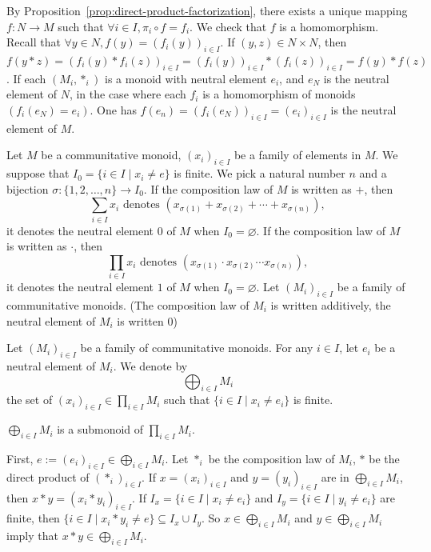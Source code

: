 \begin{proofenv}
    By Proposition~\ref{prop:direct-product-factorization},  there exists a unique mapping $f:N\rightarrow M$ such that $\forall i\in I,  \pi_i\circ f=f_i $. We check that $f$ is a homomorphism. 
    \newline
    Recall that $\forall y\in N,  f(y)=(f_i(y))_{i\in I}$. If $(y, z)\in N\times N$,  then $f(y*z)=(f_i(y)*f_i(z))_{i\in I}=(f_i(y))_{i\in I}*(f_i(z))_{i\in I}=f(y)*f(z)$. If each $(M_i, *_i)$ is a monoid with neutral element $e_i$,  and $e_N$ is the neutral element of $N$,  in the case where each $f_i$ is a homomorphism of monoids $(f_i(e_N)=e_i)$. One has $f(e_n)=(f_i(e_N))_{i\in I}=(e_i)_{i\in I}$ is the neutral element of $M$.
\end{proofenv}
\begin{notationenv}
    Let $M$ be a communitative monoid,  $(x_i)_{i\in I}$ be a family of elements in $M$. We suppose that $I_0=\{i\in I\mid x_i\not=e\}$ is finite. We pick a natural number $n$ and a bijection $\sigma:\{1, 2, \dots, n\}\rightarrow I_0$. If the composition law of $M$ is written as $+$,  then 
    $$\sum_{i\in I}x_i \text{ denotes }(x_{\sigma(1)}+x_{\sigma(2)}+\cdots+x_{\sigma(n)}), $$
    it denotes the neutral element $0$ of $M$ when $I_0=\varnothing$. If the composition law of $M$ is written as $\cdot$,  then 
    $$\prod_{i\in I}x_i \text{ denotes }(x_{\sigma(1)}\cdot x_{\sigma(2)}\cdots x_{\sigma(n)}), $$
    it denotes the neutral element $1$ of $M$ when $I_0=\varnothing$.
    \newline
    Let $(M_i)_{i\in I}$ be a family of communitative monoids. (The composition law of $M_i$ is written additively,  the neutral element of $M_i$ is written $0$)
\end{notationenv}
\begin{notationenv}
    Let $(M_i)_{i\in I}$ be a family of communitative monoids. For any $i\in I$,  let $e_i$ be a neutral element of $M_i$. 
    We denote by 
    $$\bigoplus_{i\in I}M_i$$ 
    the set of $(x_i)_{i\in I}\in \prod_{i\in I}M_i$ such that $\{i\in I\mid x_i\not=e_i\}$ is finite. 
\end{notationenv}
\begin{propositionenv}
    $\displaystyle\bigoplus_{i\in I}M_i$ is a submonoid of $\displaystyle\prod_{i\in I}M_i$.
\end{propositionenv}
\begin{proofenv}
    First,  $e:=(e_i)_{i\in I}\in \bigoplus_{i\in I}M_i$. Let $*_i$ be the composition law of $M_i$,  $*$ be the direct product of $(*_i)_{i\in I}$. If $x=(x_i)_{i\in I}$ and $y=(y_i)_{i\in I}$ are in $\bigoplus_{i\in I}M_i$,  then $x*y=(x_i*y_i)_{i\in I}$. If $I_x=\{i\in I\mid x_i\not=e_i\}$ and $I_y=\{i\in I\mid y_i\not=e_i\}$ are finite,  then $\{i\in I\mid x_i*y_i\not=e\}\subseteq I_x\cup I_y$. So $x\in \bigoplus_{i\in I}M_i$ and $y\in \bigoplus_{i\in I}M_i$ imply that $x*y\in\bigoplus_{i\in I}M_i$.
\end{proofenv}
